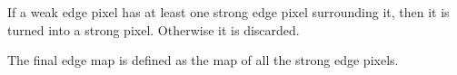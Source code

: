 \documentclass{article}
\begin{document}
\begin{multicols}{3}
\begin{enumerate}
If a weak edge pixel has at least one strong edge pixel surrounding it, then it is turned into a strong pixel. Otherwise it is discarded.

The final edge map is defined as the map of all the strong edge pixels.

\end{enumerate}










\end{multicols}
\end{document}
